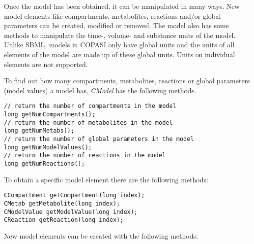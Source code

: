 \documentclass[a4,10pt]{article}
\begin{document}
Once the model has been obtained, it can be manipulated in many ways. New model elements like compartments, metabolites, reactions and/or global parameters can be created, modified or removed. The model also has some methods to manipulate the time-, volume- and substance units of the model. Unlike SBML, models in COPASI only have global units and the units of all elements of the model are made up of these global units. Units on individual elements are not supported.

To find out how many compartments, metabolites, reactions or global parameters (model values) a model has, \textit{CModel} has the following methods.

\begin{lstlisting}
// return the number of compartments in the model
long getNumCompartments(); 
// return the number of metabolites in the model
long getNumMetabs(); 
// return the number of global parameters in the model
long getNumModelValues();
// return the number of reactions in the model
long getNumReactions(); 
\end{lstlisting}

To obtain a specific model element there are the following methods:

\begin{lstlisting}
CCompartment getCompartment(long index);
CMetab getMetabolite(long index);
CModelValue getModelValue(long index);
CReaction getReaction(long index);
\end{lstlisting}

New model elements can be created with the following methods:
\end{document}

